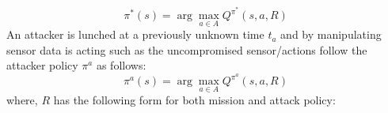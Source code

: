 \documentclass[letterpaper, 10 pt, conference]{ieeeconf}  %
\newtheorem{problem}{Problem}
\newcommand\NB[1]{$\spadesuit$\footnote{NB: #1}}
\begin{document}
\begin{equation}
\pi^*(s) = \arg\!\max_{a\in A} Q^{\pi^*}(s,a,R)
\label{eq:pistar}
\end{equation}
An attacker is lunched at a previously unknown time $t_a$ and by manipulating sensor data is acting such as the uncompromised sensor/actions follow the attacker policy $\pi^a$ as follows:
\begin{equation}
\pi^a(s) = \arg\!\max_{a\in A} Q^{\pi^a}(s,a,R)
\end{equation}
where, $R$ has the following form for both mission and attack policy:
%
\end{document}
